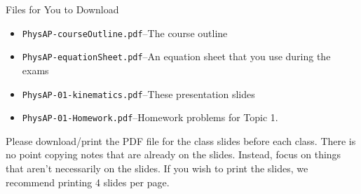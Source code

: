 \documentclass[12pt,compress,aspectratio=169]{beamer}
\begin{document}
\begin{frame}
  \titlepage
\end{frame}

\begin{frame}{Files for You to Download}
  \begin{itemize}
  \item\texttt{PhysAP-courseOutline.pdf}--The course outline
  \item\texttt{PhysAP-equationSheet.pdf}--An equation sheet that you use during
    the exams
  \item\texttt{PhysAP-01-kinematics.pdf}--These presentation slides
  \item\texttt{PhysAP-01-Homework.pdf}--Homework problems for Topic 1.
  \end{itemize}
  
  \vspace{.1in}Please download/print the PDF file for the class slides before
  each class. There is no point copying notes that are already on the slides.
  Instead, focus on things that aren't necessarily on the slides. If you wish
  to print the slides, we recommend printing 4 slides per page.
\end{frame}
\end{document}
